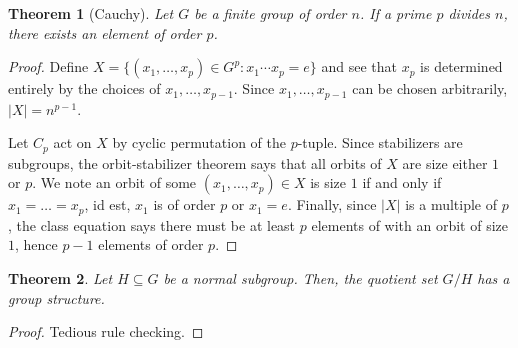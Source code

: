 \documentclass[
    parskip=half,
    toc=flat,
    toc=sectionentrydotfill,
]{scrartcl}  %
\theoremstyle{definition}
\theoremstyle{plain}
\newtheorem{theorem}{Theorem}[section]
\theoremstyle{remark}
\begin{document}
\begin{theorem}[Cauchy]
    Let $G$ be a finite group of order $n$.
    If a prime $p$ divides $n$, there exists an element of order $p$.
\end{theorem}

\begin{proof}
    Define $X=\{(x_1,\dots,x_p)\in G^p:x_1\cdots x_p=e\}$ and see that $x_p$
    is determined entirely by the choices of $x_1,\dots,x_{p-1}$.
    Since $x_1,\dots,x_{p-1}$ can be chosen arbitrarily, $|X|=n^{p-1}$.

    Let $C_p$ act on $X$ by cyclic permutation of the $p$-tuple.
    Since stabilizers are subgroups, the orbit-stabilizer theorem says that all
    orbits of $X$ are size either $1$ or $p$.
    We note an orbit of some $(x_1,\dots,x_p)\in X$ is size $1$ if and only if
    $x_1=\dots=x_p$, id est, $x_1$ is of order $p$ or $x_1=e$.
    Finally, since $|X|$ is a multiple of $p$, the class equation says there
    must be at least $p$ elements of with an orbit of size $1$, hence $p-1$
    elements of order $p$.
\end{proof}

\begin{theorem}
    Let $H\subseteq G$ be a normal subgroup.
    Then, the quotient set $G/H$ has a group structure.
\end{theorem}

\begin{proof}
    Tedious rule checking.
\end{proof}
\end{document}
